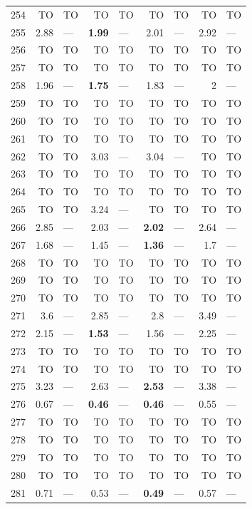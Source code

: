 \begin{longtable}{lr@{\hskip 4pt}l@{\hskip 12pt}r@{\hskip 4pt}l@{\hskip 12pt}r@{\hskip 4pt}l@{\hskip 12pt}r@{\hskip 4pt}l@{\hskip 12pt}}
254 & TO & TO & TO & TO & TO & TO & TO & TO \\
255 & 2.88 & --- & \textbf{1.99} & --- & 2.01 & --- & 2.92 & --- \\
256 & TO & TO & TO & TO & TO & TO & TO & TO \\
257 & TO & TO & TO & TO & TO & TO & TO & TO \\
258 & 1.96 & --- & \textbf{1.75} & --- & 1.83 & --- & 2 & --- \\
259 & TO & TO & TO & TO & TO & TO & TO & TO \\
260 & TO & TO & TO & TO & TO & TO & TO & TO \\
261 & TO & TO & TO & TO & TO & TO & TO & TO \\
262 & TO & TO & 3.03 & --- & 3.04 & --- & TO & TO \\
263 & TO & TO & TO & TO & TO & TO & TO & TO \\
264 & TO & TO & TO & TO & TO & TO & TO & TO \\
265 & TO & TO & 3.24 & --- & TO & TO & TO & TO \\
266 & 2.85 & --- & 2.03 & --- & \textbf{2.02} & --- & 2.64 & --- \\
267 & 1.68 & --- & 1.45 & --- & \textbf{1.36} & --- & 1.7 & --- \\
268 & TO & TO & TO & TO & TO & TO & TO & TO \\
269 & TO & TO & TO & TO & TO & TO & TO & TO \\
270 & TO & TO & TO & TO & TO & TO & TO & TO \\
271 & 3.6 & --- & 2.85 & --- & 2.8 & --- & 3.49 & --- \\
272 & 2.15 & --- & \textbf{1.53} & --- & 1.56 & --- & 2.25 & --- \\
273 & TO & TO & TO & TO & TO & TO & TO & TO \\
274 & TO & TO & TO & TO & TO & TO & TO & TO \\
275 & 3.23 & --- & 2.63 & --- & \textbf{2.53} & --- & 3.38 & --- \\
276 & 0.67 & --- & \textbf{0.46} & --- & \textbf{0.46} & --- & 0.55 & --- \\
277 & TO & TO & TO & TO & TO & TO & TO & TO \\
278 & TO & TO & TO & TO & TO & TO & TO & TO \\
279 & TO & TO & TO & TO & TO & TO & TO & TO \\
280 & TO & TO & TO & TO & TO & TO & TO & TO \\
281 & 0.71 & --- & 0.53 & --- & \textbf{0.49} & --- & 0.57 & --- \\

\end{longtable}
